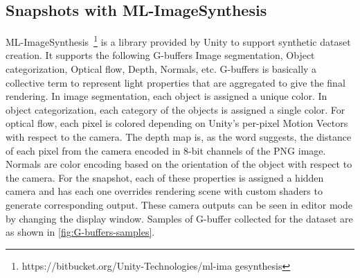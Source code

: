 \subsection{Snapshots with ML-ImageSynthesis}\label{subsec:snapshots-with-ml-imagesynthesis}

ML-ImageSynthesis~\footnote{https://bitbucket.org/Unity-Technologies/ml-ima gesynthesis} is a library provided by Unity to support synthetic dataset creation.
It supports the following G-buffers Image segmentation, Object categorization, Optical flow, Depth, Normals, etc.
G-buffers is basically a collective term to represent light properties that are aggregated to give the final rendering.
In image segmentation, each object is assigned a unique color.
In object categorization, each category of the objects is assigned a single color.
For optical flow, each pixel is colored depending on Unity's per-pixel Motion Vectors with respect to the camera.
The depth map is, as the word suggests, the distance of each pixel from the camera encoded in 8-bit channels of the PNG image.
Normals are color encoding based on the orientation of the object with respect to the camera.
For the snapshot, each of these properties is assigned a hidden camera and has each one overrides rendering scene with custom shaders to generate corresponding output.
These camera outputs can be seen in editor mode by changing the display window.
Samples of G-buffer collected for the dataset are as shown in \autoref{fig:G-buffers-samples}.

